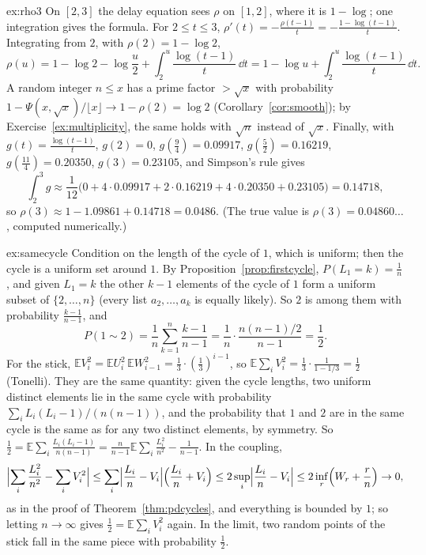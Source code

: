 \begin{solution}{ex:rho3}
\idea On $[2,3]$ the delay equation sees $\rho$ on $[1,2]$, where it is $1-\log$; one integration gives the formula.
\writeup For $2\le t\le3$, $\rho'(t)=-\frac{\rho(t-1)}t=-\frac{1-\log(t-1)}t$. Integrating from $2$, with $\rho(2)=1-\log2$,
\[
\rho(u)=1-\log2-\log\frac u2+\int_2^u\frac{\log(t-1)}t\,\dd t=1-\log u+\int_2^u\frac{\log(t-1)}t\,\dd t.
\]
A random integer $n\le x$ has a prime factor $>\sqrt x$ with probability $1-\Psi(x,\sqrt x)/\lfloor x\rfloor\to1-\rho(2)=\log2$ (Corollary~\ref{cor:smooth}); by Exercise~\ref{ex:multiplicity}, the same holds with $\sqrt n$ instead of $\sqrt x$. Finally, with $g(t)=\frac{\log(t-1)}t$, $g(2)=0$, $g(\frac94)=0.09917$, $g(\frac52)=0.16219$, $g(\frac{11}4)=0.20350$, $g(3)=0.23105$, and Simpson's rule gives
\[
\int_2^3g\approx\frac1{12}\bigl(0+4\cdot0.09917+2\cdot0.16219+4\cdot0.20350+0.23105\bigr)=0.14718,
\]
so $\rho(3)\approx1-1.09861+0.14718=0.0486$. (The true value is $\rho(3)=0.04860\ldots$, computed numerically.)
\end{solution}

\begin{solution}{ex:samecycle}
\idea Condition on the length of the cycle of $1$, which is uniform; then the cycle is a uniform set around $1$.
\writeup By Proposition~\ref{prop:firstcycle}, $P(L_1=k)=\frac1n$, and given $L_1=k$ the other $k-1$ elements of the cycle of $1$ form a uniform subset of $\{2,\dots,n\}$ (every list $a_2,\dots,a_k$ is equally likely). So $2$ is among them with probability $\frac{k-1}{n-1}$, and
\[
P(1\sim2)=\frac1n\sum_{k=1}^n\frac{k-1}{n-1}=\frac1n\cdot\frac{n(n-1)/2}{n-1}=\frac12.
\]
For the stick, $\mathbb EV_i^2=\mathbb EU_i^2\,\mathbb EW_{i-1}^2=\frac13\cdot(\frac13)^{i-1}$, so $\mathbb E\sum_iV_i^2=\frac13\cdot\frac1{1-1/3}=\frac12$ (Tonelli). They are the same quantity: given the cycle lengths, two uniform distinct elements lie in the same cycle with probability
$\sum_iL_i(L_i-1)/(n(n-1))$, and the probability that $1$ and $2$ are in the same cycle is the same as for any two distinct elements, by symmetry. So $\frac12=\mathbb E\sum_i\frac{L_i(L_i-1)}{n(n-1)}=\frac n{n-1}\mathbb E\sum_i\frac{L_i^2}{n^2}-\frac1{n-1}$. In the coupling,
\[
\Bigl|\sum_i\frac{L_i^2}{n^2}-\sum_iV_i^2\Bigr|\le\sum_i\Bigl|\frac{L_i}n-V_i\Bigr|\Bigl(\frac{L_i}n+V_i\Bigr)\le2\sup_i\Bigl|\frac{L_i}n-V_i\Bigr|\le2\inf_r\Bigl(W_r+\frac rn\Bigr)\to0,
\]
as in the proof of Theorem~\ref{thm:pdcycles}, and everything is bounded by $1$; so letting $n\to\infty$ gives $\frac12=\mathbb E\sum_iV_i^2$ again. In the limit, two random points of the stick fall in the same piece with probability $\frac12$.
\end{solution}

